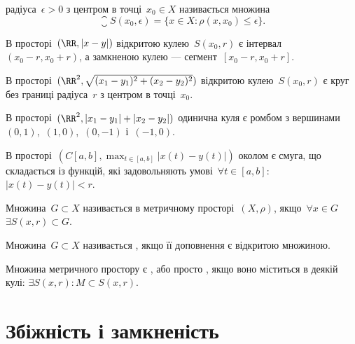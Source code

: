 \begin{definition}
 радіуса~$\epsilon > 0$ з центром в
точці~$x_0 \in X$ називається множина
\begin{equation*}
    \closure S(x_0, \epsilon) = \{x \in X: \rho(x, x_0) \le \epsilon \}.
\end{equation*}
\end{definition}

\begin{example}
В просторі~$(\RR, |x - y|)$ відкритою кулею~$S(x_0, r)$
є інтервал~$(x_0 - r, x_0 + r)$, а замкненою кулею ---
сегмент~$[x_0 - r, x_0 + r]$.
\end{example}

\begin{example}
В просторі~$(\RR^2, \sqrt{(x_1 - y_1)^2 + (x_2 - y_2)^2})$ відкритою
кулею~$S(x_0, r)$ є круг без границі радіуса~$r$ з центром в точці~$x_0$.
\end{example}

\begin{example}
В просторі~$(\RR^2, |x_1 - y_1| + |x_2 - y_2|)$ одинична
куля є ромбом з вершинами~$(0, 1)$,~$(1, 0)$,~$(0, -1)$ і~$(-1, 0)$.
\end{example}

\begin{example}
В просторі~$\left( C[a, b], \max_{t \in [a, b]} |x(t) - y(t)| \right)$
околом є смуга, що складається із функцій, які
задовольняють умові~$\forall t \in [a, b]$: $|x(t) - y (t)| < r$.
\end{example}

\begin{definition}
Множина~$G \subset  X$ називається  в
метричному просторі~$(X, \rho)$, якщо~$\forall x \in G$~$\exists S(x, r) \subset G$.
\end{definition}

\begin{definition}
Множина~$G \subset X$ називається , якщо
її доповнення є відкритою множиною.
\end{definition}

\begin{definition}
Множина метричного простору є , або просто , якщо воно
міститься в деякій кулі: $\exists S(x, r): M \subset S(x, r)$.
\end{definition}

\section{Збіжність і замкненість}

